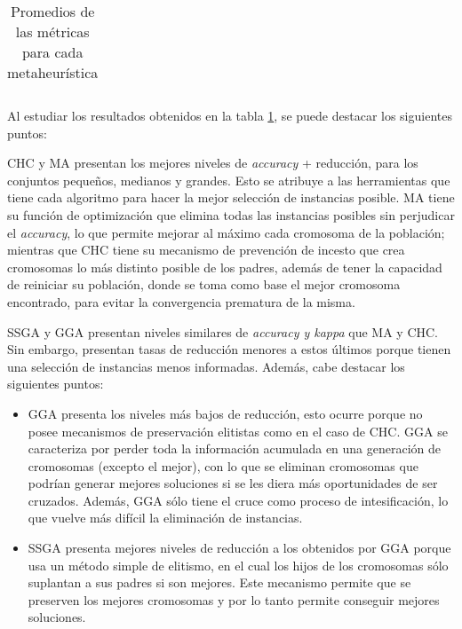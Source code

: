 \begin{table}[h!]
\begin{adjustbox}{max width =\textwidth}
\begin{tabular}{l c c c c c c c}
\hline
\end{tabular}
\end{adjustbox}
\caption{Promedios de las métricas para cada metaheurística}
\label{meta}

\end{table}

Al estudiar los resultados obtenidos en la tabla \ref{meta}, se puede destacar los siguientes puntos:

CHC y MA presentan los mejores niveles de \emph{accuracy} + reducción, para los conjuntos pequeños, medianos y grandes. Esto se atribuye a las herramientas que tiene cada algoritmo para hacer la mejor selección de instancias posible. MA tiene su función de optimización que elimina todas las instancias posibles sin perjudicar el \emph{accuracy}, lo que permite mejorar al máximo cada cromosoma de la población; mientras que CHC tiene su mecanismo de prevención de incesto que crea cromosomas lo más distinto posible de los padres, además de tener la capacidad de reiniciar su población, donde se toma como base el mejor cromosoma encontrado, para evitar la convergencia prematura de la misma.

SSGA y GGA presentan niveles similares de \emph{accuracy y kappa} que MA y CHC. Sin embargo, presentan tasas de reducción menores a estos últimos porque tienen una selección de instancias menos informadas. Además, cabe destacar los siguientes puntos:

\begin{itemize}

\item GGA presenta los niveles más bajos de reducción, esto ocurre porque no posee mecanismos de preservación elitistas como en el caso de CHC. GGA se caracteriza por perder toda la información acumulada en una generación de cromosomas (excepto el mejor), con lo que se eliminan cromosomas que podrían generar mejores soluciones si se les diera más oportunidades de ser cruzados. Además, GGA sólo tiene el cruce como proceso de intesificación, lo que vuelve más difícil la eliminación de instancias.

\item SSGA presenta mejores niveles de reducción a los obtenidos por GGA porque usa un método simple de elitismo, en el cual los hijos de los cromosomas sólo suplantan a sus padres si son mejores. Este mecanismo permite que se preserven los mejores cromosomas y por lo tanto permite conseguir mejores soluciones.

\end{itemize}


